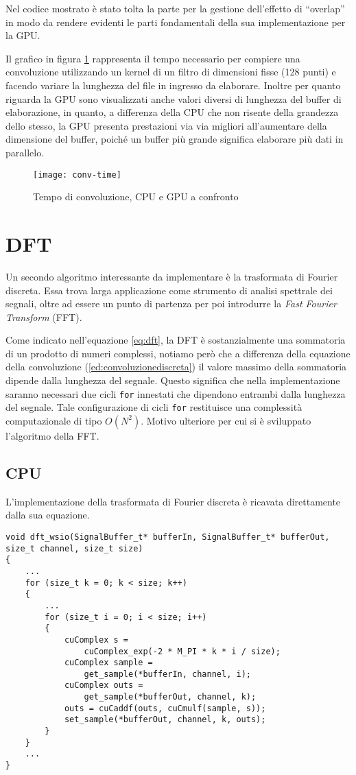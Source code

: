 Nel codice mostrato è stato tolta la parte per la gestione dell'effetto di ``overlap'' in modo da rendere evidenti le parti fondamentali della sua implementazione per la GPU.

Il grafico in figura \ref{fig:convtime} rappresenta il tempo necessario per compiere una convoluzione utilizzando un kernel di un filtro di dimensioni fisse (128 punti) e facendo variare la lunghezza del file in ingresso da elaborare. Inoltre per quanto riguarda la GPU sono visualizzati anche valori diversi di lunghezza del buffer di elaborazione, in quanto, a differenza della CPU che non risente della grandezza dello stesso, la GPU presenta prestazioni via via migliori all'aumentare della dimensione del buffer, poiché un buffer più grande significa elaborare più dati in parallelo.
\begin{figure}[h]
    \centering
    \texttt{[image: conv-time]}
    \caption{Tempo di convoluzione, CPU e GPU a confronto}
    \label{fig:convtime}
\end{figure}

\section{DFT}
Un secondo algoritmo interessante da implementare è la trasformata di Fourier discreta. Essa trova larga applicazione come strumento di analisi spettrale dei segnali, oltre ad essere un punto di partenza per poi introdurre la \textit{Fast Fourier Transform} (FFT).

Come indicato nell'equazione \ref{eq:dft}, la DFT è sostanzialmente una sommatoria di un prodotto di numeri complessi, notiamo però che a differenza della equazione della convoluzione (\ref{ed:convoluzionediscreta}) il valore massimo della sommatoria dipende dalla lunghezza del segnale. Questo significa che nella implementazione saranno necessari due cicli \lstinline{for} innestati che dipendono entrambi dalla lunghezza del segnale. Tale configurazione di cicli \lstinline{for} restituisce una complessità computazionale di tipo $O(N^2)$. Motivo ulteriore per cui si è sviluppato l'algoritmo della FFT.

\subsection{CPU}
L'implementazione della trasformata di Fourier discreta è ricavata direttamente dalla sua equazione.

\begin{lstlisting}
void dft_wsio(SignalBuffer_t* bufferIn, SignalBuffer_t* bufferOut, size_t channel, size_t size)
{
    ...
    for (size_t k = 0; k < size; k++)
    {
        ...
        for (size_t i = 0; i < size; i++)
        {
            cuComplex s =
                cuComplex_exp(-2 * M_PI * k * i / size);
            cuComplex sample =
                get_sample(*bufferIn, channel, i);
            cuComplex outs =
                get_sample(*bufferOut, channel, k);
            outs = cuCaddf(outs, cuCmulf(sample, s));
            set_sample(*bufferOut, channel, k, outs);
        }
    }
    ...
}
\end{lstlisting}

